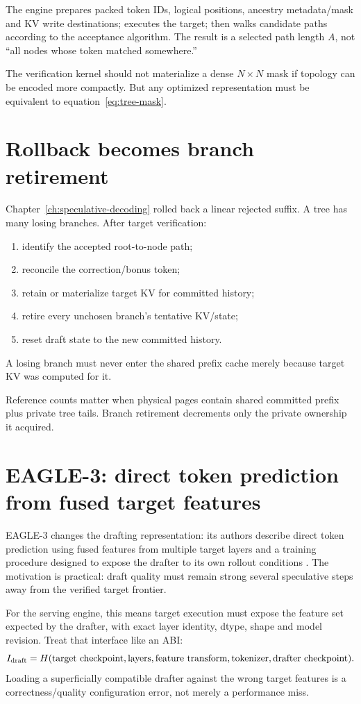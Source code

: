 The engine prepares packed token IDs, logical positions, ancestry metadata/mask and KV
write destinations; executes the target; then walks candidate paths according to the
acceptance algorithm. The result is a selected path length $A$, not ``all nodes whose
token matched somewhere.''

The verification kernel should not materialize a dense $N\times N$ mask if topology can
be encoded more compactly. But any optimized representation must be equivalent to
equation~\eqref{eq:tree-mask}.

\section{Rollback becomes branch retirement}

Chapter~\ref{ch:speculative-decoding} rolled back a linear rejected suffix. A tree has
many losing branches. After target verification:
\begin{enumerate}
\item identify the accepted root-to-node path;
\item reconcile the correction/bonus token;
\item retain or materialize target KV for committed history;
\item retire every unchosen branch's tentative KV/state;
\item reset draft state to the new committed history.
\end{enumerate}
A losing branch must never enter the shared prefix cache merely because target KV was
computed for it.

Reference counts matter when physical pages contain shared committed prefix plus private
tree tails. Branch retirement decrements only the private ownership it acquired.

\section{EAGLE-3: direct token prediction from fused target features}

EAGLE-3 changes the drafting representation: its authors describe direct token
prediction using fused features from multiple target layers and a training procedure
designed to expose the drafter to its own rollout conditions \cite{li2025eagle3}.
The motivation is practical: draft quality must remain strong several speculative
steps away from the verified target frontier.

For the serving engine, this means target execution must expose the feature set expected
by the drafter, with exact layer identity, dtype, shape and model revision. Treat that
interface like an ABI:
\[
I_{\rm draft}=
H(\text{target checkpoint},\text{layers},\text{feature transform},
\text{tokenizer},\text{drafter checkpoint}).
\]
Loading a superficially compatible drafter against the wrong target features is a
correctness/quality configuration error, not merely a performance miss.

